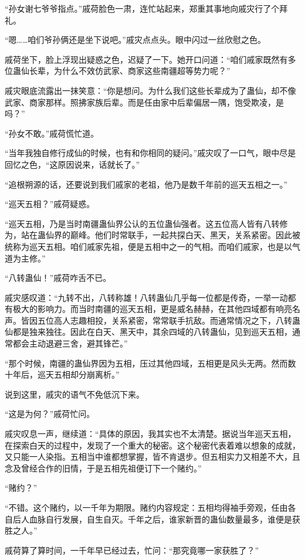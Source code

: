 \begin{this_body}
“孙女谢七爷爷指点。”戚荷脸色一肃，连忙站起来，郑重其事地向戚灾行了个拜礼。

“嗯……咱们爷孙俩还是坐下说吧。”戚灾点点头。眼中闪过一丝欣慰之色。

戚荷坐下，脸上浮现出疑惑之色，迟疑了一下。她开口问道：“咱们戚家既然有多位蛊仙长辈，为什么不效仿武家、商家这些南疆超等势力呢？”

戚灾眼底流露出一抹笑意：“你是想问。为什么我们这些长辈成为了蛊仙，却不像武家、商家那样。照拂家族后辈。而是任由家中后辈偏居一隅，饱受欺凌，是吗？”

“孙女不敢。”戚荷慌忙道。

“当年我独自修行成仙的时候，也有和你相同的疑问。”戚灾叹了一口气，眼中尽是回忆之色，“这原因说来，话就长了。”

“追根朔源的话，还要说到我们戚家的老祖，他乃是数千年前的巡天五相之一。”

“巡天五相？”戚荷疑惑。

“巡天五相，乃是当时南疆蛊仙界公认的五位蛊仙强者。这五位高人皆有八转修为，站在蛊仙界的巅峰。他们时常联手，一起共探白天、黑天，关系紧密。因此被统称为巡天五相。咱们戚家先祖，便是五相中之一的气相。而咱们戚家，也是以气道为主修。”

“八转蛊仙！”戚荷咋舌不已。

戚灾感叹道：“九转不出，八转称雄！八转蛊仙几乎每一位都是传奇，一举一动都有极大的影响力。而当时南疆的巡天五相，更是威名赫赫，在其他四域都有响亮名声。皆因五位高人志趣相投，关系紧密，常常联手抗敌。而通常情况之下，八转蛊仙都是独来独往。因此在白天、黑天中，其余四域的八转蛊仙，见到巡天五相，通常都会主动退避三舍，避其锋芒。”

“那个时候，南疆的蛊仙界因为五相，压过其他四域，五相更是风头无两。然而数十年后，巡天五相却分崩离析。”

说到这里，戚灾的语气不免低沉下来。

“这是为何？”戚荷忙问。

戚灾叹息一声，继续道：“具体的原因，我其实也不太清楚。据说当年巡天五相，在探索白天的过程中，发现了一个重大的秘密。这个秘密代表着难以想象的成就，又只能一人染指。五相当中谁都想掌握，皆不肯退步。但五相实力又相差不大，且念及曾经合作的旧情，于是五相先祖便订下一个赌约。”

“赌约？”

“不错。这个赌约，以一千年为期限。赌约内容规定：五相均得袖手旁观，任由各自后人血脉自行发展，自生自灭。千年之后，谁家新晋的蛊仙数量最多，谁便是获胜之人。”

戚荷算了算时间，一千年早已经过去，忙问：“那究竟哪一家获胜了？”


\end{this_body}
